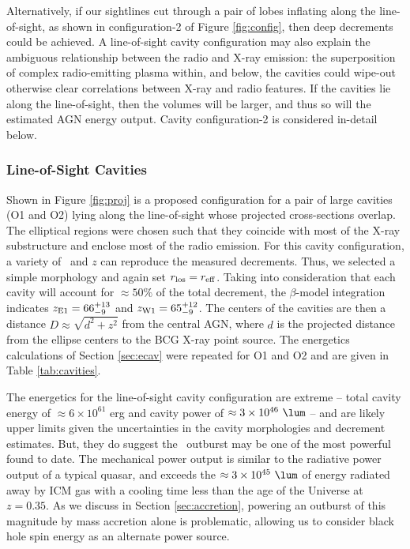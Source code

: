 \documentclass[11pt, preprint]{aastex}
\begin{document}
Alternatively, if our sightlines cut through a pair of lobes inflating
along the line-of-sight, as shown in configuration-2 of Figure
\ref{fig:config}, then deep decrements could be achieved. A
line-of-sight cavity configuration may also explain the ambiguous
relationship between the radio and X-ray emission: the superposition
of complex radio-emitting plasma within, and below, the cavities could
wipe-out otherwise clear correlations between X-ray and radio
features. If the cavities lie along the line-of-sight, then the
volumes will be larger, and thus so will the estimated AGN energy
output. Cavity configuration-2 is considered in-detail below.

\subsubsection{Line-of-Sight Cavities}

Shown in Figure \ref{fig:proj} is a proposed configuration for a pair
of large cavities (O1 and O2) lying along the line-of-sight whose
projected cross-sections overlap. The elliptical regions were chosen
such that they coincide with most of the X-ray substructure and
enclose most of the radio emission. For this cavity configuration, a
variety of \rlos\ and $z$ can reproduce the measured decrements. Thus,
we selected a simple morphology and again set $r_{\rm{los}} = r_{\rm{eff}}$. Taking
into consideration that each cavity will account for $\approx 50\%$ of
the total decrement, the $\beta$-model integration indicates
$z_{\rm{E1}} = 66^{+13}_{-9}$ and $z_{\rm{W1}} = 65^{+12}_{-9}$. The
centers of the cavities are then a distance $D \approx \sqrt{d^2+z^2}$
from the central AGN, where $d$ is the projected distance from the
ellipse centers to the BCG X-ray point source. The energetics
calculations of Section \ref{sec:ecav} were repeated for O1 and O2 and
are given in Table \ref{tab:cavities}.

The energetics for the line-of-sight cavity configuration are extreme
-- total cavity energy of $\approx 6 \times 10^{61}$ erg and cavity
power of $\approx 3 \times 10^{46} ~\lum$ -- and are likely upper
limits given the uncertainties in the cavity morphologies and
decrement estimates. But, they do suggest the \rbs\ outburst may be
one of the most powerful found to date. The mechanical power output is
similar to the radiative power output of a typical quasar, and exceeds
the $\approx 3 \times 10^{45} ~\lum$ of energy radiated away by ICM
gas with a cooling time less than the age of the Universe at
$z=0.35$. As we discuss in Section \ref{sec:accretion}, powering an
outburst of this magnitude by mass accretion alone is problematic,
allowing us to consider black hole spin energy as an alternate power
source.
\end{document}

